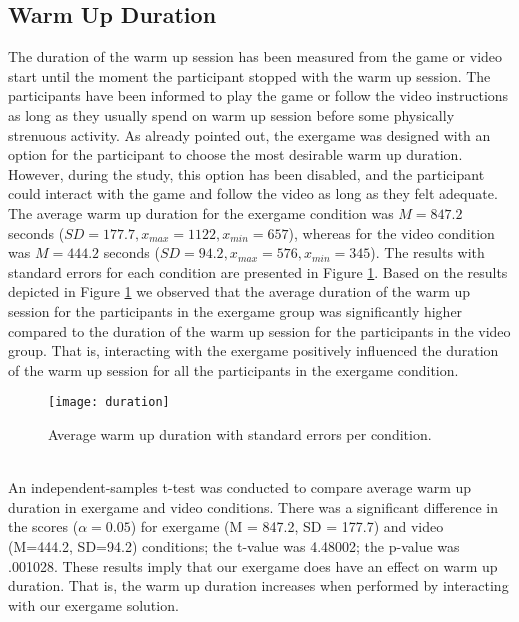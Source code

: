 \subsection{Warm Up Duration}
The duration of the warm up session has been measured from the game or video start until the moment the participant stopped with the warm up session. The participants have been informed to play the game or follow the video instructions as long as they usually spend on warm up session before some physically strenuous activity. As already pointed out, the exergame was designed with an option for the participant to choose the most desirable warm up duration. However, during the study, this option has been disabled, and the participant could interact with the game and follow the video as long as they felt adequate. The average warm up duration for the exergame condition was \begin{math}M = 847.2 \end{math} seconds (\begin{math} SD = 177.7, x_{max}=1122, x_{min}=657 \end{math}), whereas for the video condition was \begin{math}M = 444.2 \end{math} seconds (\begin{math} SD = 94.2, x_{max}= 576, x_{min}= 345\end{math}). The  results with standard errors for each condition are presented in Figure \ref{fig:wuduration}. Based on the results depicted in Figure \ref{fig:wuduration} we observed that the average duration of the warm up session for the participants in the exergame group was significantly higher compared to the duration of the warm up session for the participants in the video group. That is, interacting with the exergame positively influenced the duration of the warm up session for all the participants in the exergame condition.
\begin{figure}[h]
    \centering
    \texttt{[image: duration]}
    \caption{Average warm up duration with standard errors per condition.}
    \label{fig:wuduration}
\end{figure}\\
An independent-samples t-test was conducted to compare average warm up duration in exergame and video conditions. There was a significant difference in the scores  (\begin{math}\alpha = 0.05\end{math}) for exergame (M = 847.2, SD = 177.7) and video (M=444.2, SD=94.2) conditions; the t-value was 4.48002; the p-value was .001028. These results imply that our exergame does have an effect on warm up duration. That is, the warm up duration increases when performed by interacting with our exergame solution. 

